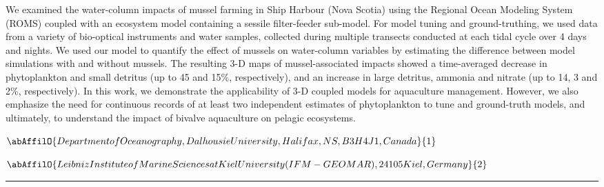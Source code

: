 \noindent We examined the water-column impacts of mussel farming in Ship Harbour (Nova Scotia) using the Regional Ocean Modeling System (ROMS) coupled with an ecosystem model containing a sessile filter-feeder sub-model. For model tuning and ground-truthing, we used data from a variety of bio-optical instruments and water samples, collected during multiple transects conducted at each tidal cycle over 4 days and nights. We used our model to quantify the effect of mussels on water-column variables by estimating the difference between model simulations with and without mussels. The resulting 3-D maps of mussel-associated impacts showed a time-averaged decrease in phytoplankton and small detritus (up to 45 and 15\%, respectively), and an increase in large detritus, ammonia and nitrate (up to 14, 3 and 2\%, respectively). In this work, we demonstrate the applicability of 3-D coupled models for aquaculture management. However, we also emphasize the need for continuous records of at least two independent estimates of phytoplankton to tune and ground-truth models, and ultimately, to understand the impact of bivalve aquaculture on pelagic ecosystems.

\begin{center}
   \vspace{2 mm} \begin{center}
    \vspace{2 mm}\begin{center}
  
  $\abAffilO{Department of Oceanography, Dalhousie University, Halifax, NS, B3H 4J1, Canada}{1}$

  
  $\abAffilO{Leibniz Institute of Marine Sciences at Kiel University (IFM-GEOMAR), 24105 Kiel, Germany}{2}$

  \end{center}
  \vspace{2 mm}
  \end{center}\end{center}
  \begin{center}\rule{0.70\linewidth}{0.5 pt}\end{center}

